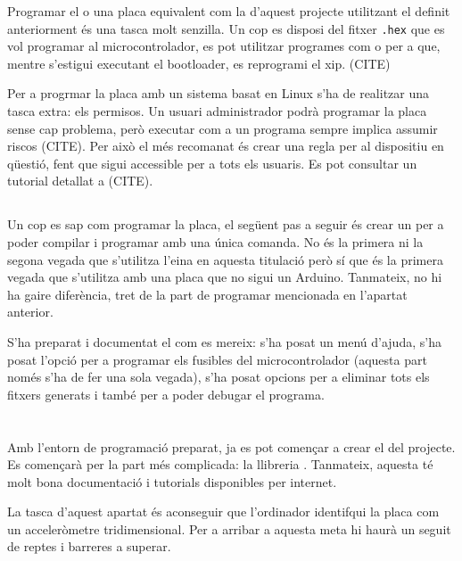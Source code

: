 Programar el  o una placa equivalent com la d'aquest projecte
utilitzant el  definit anteriorment és una tasca molt senzilla.
Un cop es disposi del fitxer \verb|.hex| que es vol programar al
microcontrolador, es pot utilitzar programes com  o
 per a que, mentre s'estigui executant el bootloader, es 
reprogrami el xip. (CITE)

Per a progrmar la placa amb un sistema basat en Linux s'ha de realitzar una
tasca extra: els permisos. Un usuari administrador podrà programar la placa
sense cap problema, però executar com a  un programa sempre implica
assumir riscos (CITE). Per això el més recomanat és crear una regla 
per al dispositiu en qüestió, fent que sigui accessible per a tots els usuaris.
Es pot consultar un tutorial detallat a (CITE).

\subsection{}

Un cop es sap com programar la placa, el següent pas a seguir és crear un
 per a poder compilar i programar amb una única comanda.
No és la primera ni la segona vegada que s'utilitza l'eina  en
aquesta titulació però sí que és la primera vegada que s'utilitza amb una placa
que no sigui un Arduino. Tanmateix, no hi ha gaire diferència, tret de la
part de programar mencionada en l'apartat anterior.

S'ha preparat i documentat el  com es mereix: s'ha posat un menú
d'ajuda, s'ha posat l'opció per a programar els fusibles del microcontrolador
(aquesta part només s'ha de fer una sola vegada), s'ha posat opcions per a
eliminar tots els fitxers generats i també per a poder debugar el programa.

\section{}

Amb l'entorn de programació preparat, ja es pot començar a crear el
 del projecte. Es començarà per la part més complicada: la
llibreria . Tanmateix, aquesta té molt bona documentació i
tutorials disponibles per internet.

La tasca d'aquest apartat és aconseguir que l'ordinador identifqui la placa
com un acceleròmetre tridimensional. Per a arribar a aquesta meta hi haurà un
seguit de reptes i barreres a superar.

